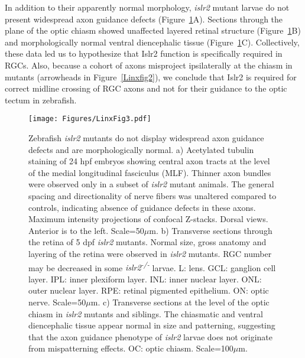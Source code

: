 In addition to their apparently normal morphology, \emph{islr2} mutant larvae do not present widespread axon guidance defects (Figure~\ref{Linxfig3}A).
Sections through the plane of the optic chiasm showed unaffected layered retinal structure (Figure~\ref{Linxfig3}B) and morphologically normal ventral diencephalic tissue (Figure~\ref{Linxfig3}C).
Collectively, these data led us to hypothesize that Islr2 function is specifically required in RGCs.
Also, because a cohort of axons misproject ipsilaterally at the chiasm in mutants (arrowheads in Figure~\ref{Linxfig2}), we conclude that Islr2 is required for correct midline crossing of RGC axons and not for their guidance to the optic tectum in zebrafish.
\begin{figure}[hbtp]
    \begin{center}
        \texttt{[image: Figures/LinxFig3.pdf]}
        \caption[Zebrafish \emph{islr2} mutants do not display widespread axon guidance defects and are morphologically normal.]
        {Zebrafish \emph{islr2} mutants do not display widespread axon guidance defects and are morphologically normal.
		a) Acetylated tubulin staining of 24 hpf embryos showing central axon tracts at the level of the medial longitudinal fasciculus (MLF).
		Thinner axon bundles were observed only in a subset of \emph{islr2} mutant animals.
		The general spacing and directionality of nerve fibers was unaltered compared to controls, indicating absence of guidance defects in these axons.
		Maximum intensity projections of confocal Z-stacks.
		Dorsal views.
		Anterior is to the left.
		Scale=50$\mu$m.
		b) Transverse sections through the retina of 5 dpf \emph{islr2} mutants.
		Normal size, gross anatomy and layering of the retina were observed in \emph{islr2} mutants.
		RGC number may be decreased in some \emph{islr2\textsuperscript{-/-}} larvae.
		L: lens.
		GCL: ganglion cell layer.
		IPL: inner plexiform layer.
		INL: inner nuclear layer.
		ONL: outer nuclear layer.
		RPE: retinal pigmented epithelium.
		ON: optic nerve.
		Scale=50$\mu$m.
		c) Transverse sections at the level of the optic chiasm in \emph{islr2} mutants and siblings.
		The chiasmatic and ventral diencephalic tissue appear normal in size and patterning, suggesting that the axon guidance phenotype of \emph{islr2} larvae does not originate from mispatterning effects.
		OC: optic chiasm.
		Scale=100$\mu$m.
}
        \label{Linxfig3}
    \end{center}
\end{figure}

